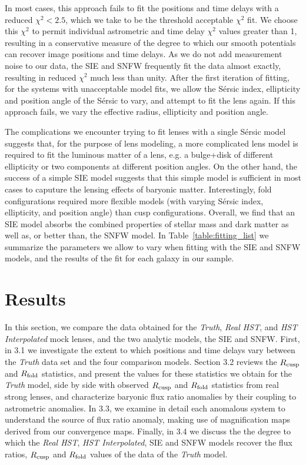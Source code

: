 In most cases, this approach fails to fit the positions and time delays with a reduced $\chi^2 < 2.5$, which we take to be the threshold acceptable $\chi^2$ fit. We choose this $\chi^2$ to permit individual astrometric and time delay $\chi^2$ values greater than 1, resulting in a conservative measure of the degree to which our smooth potentials can recover image positions and time delays. As we do not add measurement noise to our data, the SIE and SNFW frequently fit the data almost exactly, resulting in reduced $\chi^2$ much less than unity. After the first iteration of fitting, for the systems with unacceptable model fits, we allow the S{\'e}rsic index, ellipticity and position angle of the S{\'e}rsic to vary, and attempt to fit the lens again. If this approach fails, we vary the effective radius, ellipticity and position angle. 

The complications we encounter trying to fit lenses with a single S{\'e}rsic model suggests that, for the purpose of lens modeling, a more complicated lens model is required to fit the luminous matter of a lens, e.g. a bulge+disk of different ellipticity or two components at different position angles. On the other hand, the success of a simple SIE model suggests that this simple model is sufficient in most cases to caputure the lensing effects of baryonic matter. Interestingly, fold configurations required more flexible models (with varying S{\'e}rsic index, ellipticity, and position angle) than cusp configurations. Overall, we find that an SIE model absorbs the combined properties of stellar mass and dark matter as well as, or better than, the SNFW model. In Table~\ref{table:fitting_list} we summarize the parameters we allow to vary when fitting with the SIE and SNFW models, and the results of the fit for each galaxy in our sample.
\section{Results}
\label{sect:results}
In this section, we compare the data obtained for the \textit{Truth}, \textit{Real HST}, and \textit{HST Interpolated} mock lenses, and the two analytic models, the SIE and SNFW. First, in 3.1 we investigate the extent to which positions and time delays vary between the \textit{Truth} data set and the four comparison models. Section 3.2 reviews the $R_{\rm{cusp}}$ and $R_{\rm{fold}}$ statistics, and present the values for these statistics we obtain for the \textit{Truth} model, side by side with observed $R_{\rm{cusp}}$ and $R_{\rm{fold}}$ statistics from real strong lenses, and characterize baryonic flux ratio anomalies by their coupling to astrometric anomalies. In 3.3, we examine in detail each anomalous system to understand the source of flux ratio anomaly, making use of magnification maps derived from our convergence maps. Finally, in 3.4 we discuss the the degree to which the \textit{Real HST}, \textit{HST Interpolated}, SIE and SNFW models recover the flux ratios, $R_{\rm{cusp}}$ and $R_{\rm{fold}}$ values of the data of the \textit{Truth} model. 

